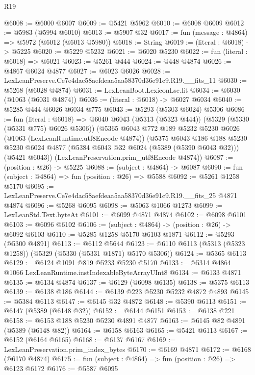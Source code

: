 \begin{lexlean}{R19}
\begin{coremodule}
@6008 := @6000 @6007
@6009 := @5421 @5962
@6010 := @6008 @6009
@6012 := @5983 (@5994 @6010)
@6013 := @5907 @32
@6017 := fun (message : @4864) => @5972 (@6012 (@6013 @5980))
@6018 := String
@6019 := (literal : @6018) -> @5225
@6020 := @5229 @5232
@6021 := @6020 @5230
@6022 := fun (literal : @6018) => @6021
@6023 := @5261 @444
@6024 := @448 @4874
@6026 := @4867 @6024 @4877
@6027 := @6023 @6026
@6028 := LexLeanPreserve.Ce7e4dac58aefdeaa5aa58370d36e91c9.R19.__fits_11
@6030 := @5268 (@6028 @4874)
@6031 := LexLeanBoot.LexiconLse.lit
@6034 := @6030 (@1063 (@6031 @4874))
@6036 := (literal : @6018) -> @6027 @6034
@6040 := @5285 @444 @6026 @6034 @775
@6043 := @5293 (@5303 @6024) @5306
@6086 := fun (literal : @6018) =>
  @6040
    @6043
    (@5313 (@5323 @444))
    (@5329 (@5330 (@5331 @775) @6026 @5306))
    (@5365
      @6043
      @772
      @189
      @5232
      @5230
      @6026
      (@1063 (LexLeanRuntime.utf8Encode @4874))
      (@5375
        @6043
        @186
        @188
        @5230
        @5230
        @6024
        @4877
        (@5384 @6043 @32 @6024 (@5389 (@5390 @6043 @32)))
        (@5421 @6043))
      (LexLeanPreservation.prim_utf8Encode @4874))
@6087 := (position : @26) -> @5225
@6088 := (subject : @4864) -> @6087
@6090 := fun (subject : @4864) => fun (position : @26) => @5588
@6092 := @5261 @1258 @5170
@6095 := LexLeanPreserve.Ce7e4dac58aefdeaa5aa58370d36e91c9.R19.__fits_25 @4871 @4874
@6096 := @5268 @6095
@6098 := @5063 @1066 @1273
@6099 := LexLeanStd.Text.byteAt
@6101 := @6099 @4871 @4874
@6102 := @6098 @6101
@6103 := @6096 @6102
@6106 := (subject : @4864) -> (position : @26) -> @6092 @6103
@6110 := @5285 @1258 @5170 @6103 @1871
@6112 := @5293 (@5300 @4891)
@6113 := @6112 @5644
@6123 := @6110 @6113 (@5313 (@5323 @1258)) (@5329 (@5330 (@5331 @1871) @5170 @5306))
@6124 := @5365 @6113
@6129 := @6124 @1091 @819 @5233 @5230 @5170
@6133 := @5314 @4864 @1066 LexLeanRuntime.instIndexableByteArrayUInt8
@6134 := @6133 @4871
@6135 := @6134 @4874
@6137 := @6129 (@6098 @6135)
@6138 := @5375 @6113
@6139 := @6138 @186
@6144 := @6139 @223 @5230 @5232 @4872 @4893
@6145 := @5384 @6113
@6147 := @6145 @32 @4872
@6148 := @5390 @6113
@6151 := @6147 (@5389 (@6148 @32))
@6152 := @6144 @6151
@6153 := @6138 @221
@6158 := @6153 @188 @5230 @5230 @4891 @4877
@6163 := @6145 @82 @4891 (@5389 (@6148 @82))
@6164 := @6158 @6163
@6165 := @5421 @6113
@6167 := @6152 (@6164 @6165)
@6168 := @6137 @6167
@6169 := LexLeanPreservation.prim_index_bytes
@6170 := @6169 @4871
@6172 := @6168 (@6170 @4874)
@6175 := fun (subject : @4864) => fun (position : @26) => @6123 @6172
@6176 := @5587 @6095

\end{coremodule}
\end{lexlean}
